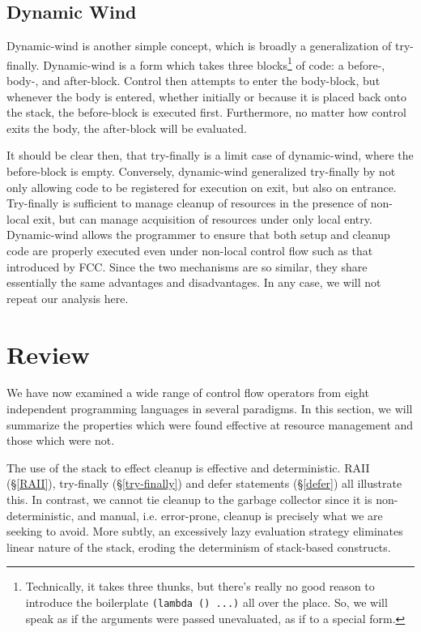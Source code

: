 \documentclass[11pt]{article}
\newcommand{\maybePage}{\newpage}
\begin{document}
\maybePage
\subsection{Dynamic Wind}
\label{dynamic-wind}

Dynamic-wind is another simple concept, which is broadly a generalization of try-finally.
Dynamic-wind is a form which takes three blocks\footnote{Technically, it takes three thunks, but there's really no good reason to introduce the boilerplate \texttt{(lambda () ...)} all over the place. So, we will speak as if the arguments were passed unevaluated, as if to a special form.} of code: a before-, body-, and after-block.
Control then attempts to enter the body-block, but whenever the body is entered, whether initially or because it is placed back onto the stack, the before-block is executed first.
Furthermore, no matter how control exits the body, the after-block will be evaluated.


It should be clear then, that try-finally is a limit case of dynamic-wind, where the before-block is empty.
Conversely, dynamic-wind generalized try-finally by not only allowing code to be registered for execution on exit, but also on entrance.
Try-finally is sufficient to manage cleanup of resources in the presence of non-local exit, but can manage acquisition of resources under only local entry.
Dynamic-wind allows the programmer to ensure that both setup and cleanup code are properly executed even under non-local control flow such as that introduced by FCC.
Since the two mechanisms are so similar, they share essentially the same advantages and disadvantages.
In any case, we will not repeat our analysis here.




\maybePage
\section{Review}
\label{sec:review}

We have now examined a wide range of control flow operators from eight independent programming languages in several paradigms.
In this section, we will summarize the properties which were found effective at resource management and those which were not.

The use of the stack to effect cleanup is effective and deterministic.
RAII (\S\ref{RAII}), try-finally (\S\ref{try-finally}) and defer statements (\S\ref{defer}) all illustrate this.
In contrast, we cannot tie cleanup to the garbage collector since it is non-deterministic, and manual, i.e. error-prone, cleanup is precisely what we are seeking to avoid.
More subtly, an excessively lazy evaluation strategy eliminates linear nature of the stack, eroding the determinism of stack-based constructs.
\end{document}
